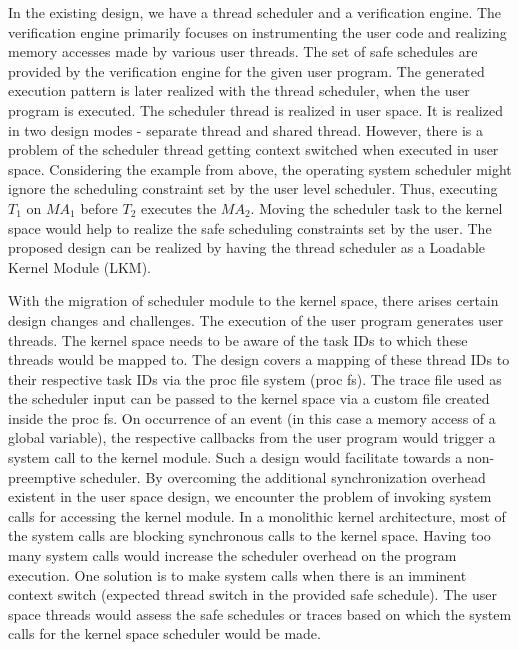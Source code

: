\documentclass[12pt]{article}
\begin{document}
In the existing design, we have a thread scheduler and a verification engine.  
The verification engine primarily focuses on instrumenting the user code and realizing memory accesses made by various user threads. 
The set of safe schedules are provided by the verification engine for the given user program. 
The generated execution pattern is later realized with the thread scheduler, when the user program is executed. 
The scheduler thread is realized in user space. 
It is realized in two design modes - separate thread and shared thread. 
However, there is a problem of the scheduler thread getting context switched when executed in user space. 
Considering the example from above, the operating system scheduler might ignore the scheduling constraint set by the user level scheduler. 
Thus, executing $T_{1}$ on $MA_{1}$ before $T_{2}$ executes the $MA_{2}$. 
Moving the scheduler task to the kernel space would help to realize the safe scheduling constraints set by the user. 
The proposed design can be realized by having the thread scheduler as a Loadable Kernel Module (LKM). 

With the migration of scheduler module to the kernel space, there arises certain design changes and challenges. 
The execution of the user program generates user threads. 
The kernel space needs to be aware of the task IDs to which these threads would be mapped to. 
The design covers a mapping of these thread IDs to their respective task IDs via the proc file system (proc fs). 
The trace file used as the scheduler input can be passed to the kernel space via a custom file created inside the proc fs. 
On occurrence of an event (in this case a memory access of a global variable), the respective callbacks from the user program would trigger a system call to the kernel module. 
Such a design would facilitate towards a non-preemptive scheduler. 
By overcoming the additional synchronization overhead existent in the user space design, we encounter the problem of invoking system calls for accessing the kernel module. 
In a monolithic kernel architecture, most of the system calls are blocking synchronous calls to the kernel space. 
Having too many system calls would increase the scheduler overhead on the program execution. 
One solution is to make system calls when there is an imminent context switch (expected thread switch in the provided safe schedule). 
The user space threads would assess the safe schedules or traces based on which the system calls for the kernel space scheduler would be made. 
\end{document}
